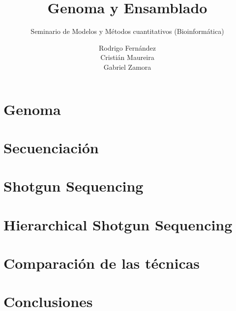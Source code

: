 \documentclass{beamer}
\author{\large Rodrigo Fernández\\ Cristián Maureira\\Gabriel Zamora}
\title{\Huge Genoma y Ensamblado}
\subtitle{Seminario de Modelos y Métodos cuantitativos (Bioinformática)}
\institute{Universidad Técnica\\Federico Santa María}
\begin{document}


\section{Genoma}

\section{Secuenciación}

\section{Shotgun Sequencing}

\section{Hierarchical Shotgun Sequencing}

\section{Comparación de las técnicas}

\section{Conclusiones}

\end{document}

